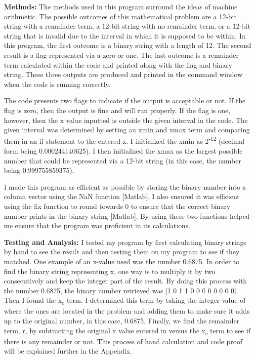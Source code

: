 \documentclass{article}
\begin{document}
{\bf Methods:} {\color{black} The methods used in this program surround the ideas of machine arithmetic.  The possible outcomes of this mathematical problem are a 12-bit string with a remainder term, a 12-bit string with no remainder term, or a 12-bit string that is invalid due to the interval in which it is supposed to be within.  In this program, the first outcome is a binary string with a length of 12.  The second result is a flag represented via a zero or one.  The last outcome is a remainder term calculated within the code and printed along with the flag and binary string. These three outputs are produced and printed in the command window when the code is running correctly.
}
\par \bigskip \par
     {\color{black}  The code presents two flags to indicate if the output is acceptable or not.  If the flag is zero, then the output is fine and will run properly.  If the flag is one, however, then the x value inputted is outside the given interval in the code.  The given interval was determined by setting an xmin and xmax term and comparing them in an if statement to the entered x.  I initialized the xmin as 2\textsuperscript{-12} (decimal form being 0.000244140625).  I then initialized the xmax as the largest possible number that could be represented via a 12-bit string (in this case, the number being 0.999755859375).  
     }
 \par \bigskip \par  
     {\color{black} I made this program as efficient as possible by storing the binary number into a column vector using the NaN function [Matlab].  I also ensured it was efficient using the fix function to round towards 0 to ensure that the correct binary number prints in the binary string [Matlab].  By using these two functions helped me ensure that the program was proficient in its calculations.
     
}
\par \bigskip \par


{\bf Testing and Analysis:} {\color{black} I tested my program by first calculating binary strings by hand to see the result and then testing them on my program to see if they matched.  One example of an x-value used was the number 0.6875.  In order to find the binary string representing x, one way is to multiply it by two consecutively and keep the integer part of the result.  By doing this process with the number 0.6875, the binary number retrieved was [1 0 1 1 0 0 0 0 0 0 0 0].  Then I found the x\textsubscript{c} term.  I determined this term by taking the integer value of where the ones are located in the problem and adding them to make sure it adds up to the original number, in this case, 0.6875.  Finally, we find the remainder term, r, by subtracting the original x value entered in versus the x\textsubscript{c} term to see if there is any remainder or not.  This process of hand calculation and code proof will be explained further in the Appendix.  }
\par \bigskip \par
\end{document}
